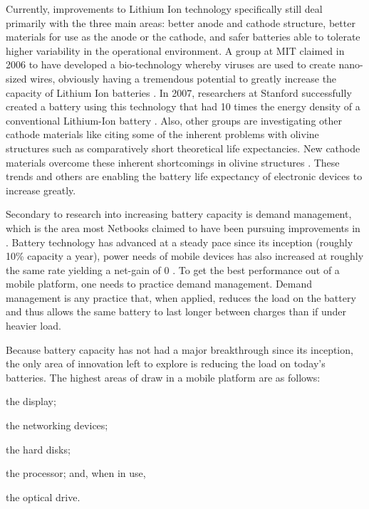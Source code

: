 Currently, improvements to Lithium Ion technology specifically still deal
primarily with the three main areas: better anode and cathode structure, better
materials for use as the anode or the cathode, and safer batteries able to
tolerate higher variability in the operational environment.  A group at MIT
claimed in 2006 to have developed a bio-technology whereby viruses are used to
create nano-sized wires, obviously having a tremendous potential to greatly
increase the capacity of Lithium Ion batteries \citep{nam2006}.  In 2007,
researchers at Stanford successfully created a battery using this technology
that had 10 times the energy density of a conventional Lithium-Ion battery
\citep{stanford2007}.  Also, other groups are investigating other cathode
materials like  citing some of the inherent problems with olivine
structures such as comparatively short theoretical life expectancies.  New
cathode materials overcome these inherent shortcomings in olivine structures
\citep{ellis2007}.  These trends and others are enabling the battery life
expectancy of electronic devices to increase greatly.

Secondary to research into increasing battery capacity is demand management,
which is the area most Netbooks claimed to have been pursuing improvements in
\citep{ap2009}.  Battery technology has advanced at a steady pace since its
inception (roughly 10\% capacity a year), power needs of mobile devices has also
increased at roughly the same rate yielding a net-gain of 0
\citep{buchmann2003}.  To get the best performance out of a mobile platform, one
needs to practice demand management.  Demand management is any practice that,
when applied, reduces the load on the battery and thus allows the same battery
to last longer between charges than if under heavier load.

Because battery capacity has not had a major breakthrough since its inception,
the only area of innovation left to explore is reducing the load on today's
batteries.  The highest areas of draw in a mobile platform are as follows:
\begin{inparaenum}[(1)]
\item the display;
\item the networking devices;
\item the hard disks;
\item the processor; and, when in use,
\item the optical drive.
\end{inparaenum}

